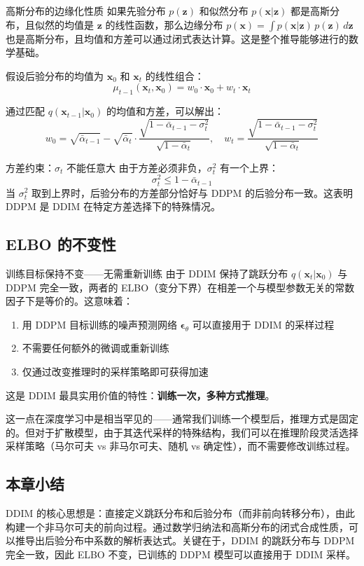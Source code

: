 \begin{knowledgebox}{高斯分布的边缘化性质}
如果先验分布 $p(\mathbf{z})$ 和似然分布 $p(\mathbf{x}|\mathbf{z})$ 都是高斯分布，且似然的均值是 $\mathbf{z}$ 的线性函数，那么边缘分布 $p(\mathbf{x}) = \int p(\mathbf{x}|\mathbf{z})\,p(\mathbf{z})\,d\mathbf{z}$ 也是高斯分布，且均值和方差可以通过闭式表达计算。这是整个推导能够进行的数学基础。
\end{knowledgebox}

假设后验分布的均值为 $\mathbf{x}_0$ 和 $\mathbf{x}_t$ 的线性组合：
$$
\mu_{t-1}(\mathbf{x}_t, \mathbf{x}_0) = w_0 \cdot \mathbf{x}_0 + w_t \cdot \mathbf{x}_t
$$

通过匹配 $q(\mathbf{x}_{t-1}|\mathbf{x}_0)$ 的均值和方差，可以解出：
$$
w_0 = \sqrt{\bar{\alpha}_{t-1}} - \sqrt{\bar{\alpha}_t} \cdot \frac{\sqrt{1-\bar{\alpha}_{t-1}-\sigma_t^2}}{\sqrt{1-\bar{\alpha}_t}}, \quad
w_t = \frac{\sqrt{1-\bar{\alpha}_{t-1}-\sigma_t^2}}{\sqrt{1-\bar{\alpha}_t}}
$$

\begin{warningbox}{方差约束：$\sigma_t$ 不能任意大}
由于方差必须非负，$\sigma_t^2$ 有一个上界：
$$
\sigma_t^2 \leq 1 - \bar{\alpha}_{t-1}
$$
当 $\sigma_t^2$ 取到上界时，后验分布的方差部分恰好与 DDPM 的后验分布一致。这表明 DDPM 是 DDIM 在特定方差选择下的特殊情况。
\end{warningbox}

\subsection{ELBO 的不变性}

\begin{importantbox}{训练目标保持不变——无需重新训练}
由于 DDIM 保持了跳跃分布 $q(\mathbf{x}_t|\mathbf{x}_0)$ 与 DDPM 完全一致，两者的 ELBO（变分下界）在相差一个与模型参数无关的常数因子下是等价的。这意味着：
\begin{enumerate}
    \item 用 DDPM 目标训练的噪声预测网络 $\boldsymbol{\epsilon}_\theta$ 可以直接用于 DDIM 的采样过程
    \item 不需要任何额外的微调或重新训练
    \item 仅通过改变推理时的采样策略即可获得加速
\end{enumerate}
这是 DDIM 最具实用价值的特性：\textbf{训练一次，多种方式推理}。
\end{importantbox}

这一点在深度学习中是相当罕见的——通常我们训练一个模型后，推理方式是固定的。但对于扩散模型，由于其迭代采样的特殊结构，我们可以在推理阶段灵活选择采样策略（马尔可夫 vs 非马尔可夫、随机 vs 确定性），而不需要修改训练过程。

\subsection{本章小结}

DDIM 的核心思想是：直接定义跳跃分布和后验分布（而非前向转移分布），由此构建一个非马尔可夫的前向过程。通过数学归纳法和高斯分布的闭式合成性质，可以推导出后验分布中系数的解析表达式。关键在于，DDIM 的跳跃分布与 DDPM 完全一致，因此 ELBO 不变，已训练的 DDPM 模型可以直接用于 DDIM 采样。


